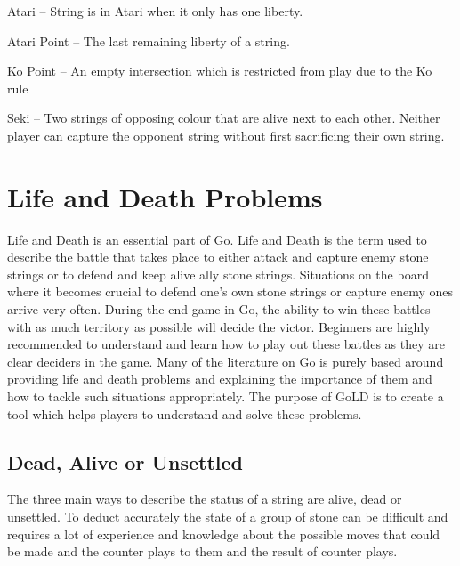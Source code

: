 \documentclass{l4proj}
\begin{document}
Atari – String is in Atari when it only has one liberty.

Atari Point – The last remaining liberty of a string.

Ko Point –  An empty intersection which is restricted from play due to the Ko rule

Seki – Two strings of opposing colour that are alive next to each other. Neither player can capture the opponent string without first sacrificing their own string.





\section{Life and Death Problems}

Life and Death is an essential part of Go. Life and Death is the term used to describe the battle that takes place to either attack and capture enemy stone strings or to defend and keep alive ally stone strings. Situations on the board where it becomes crucial to defend one’s own stone strings or capture enemy ones arrive very often. During the end game in Go, the ability to win these battles with as much territory as possible will decide the victor. Beginners are highly recommended to understand and learn how to play out these battles as they are clear deciders in the game. Many of the literature on Go is purely based around providing life and death problems and explaining the importance of them and how to tackle such situations appropriately.\cite{Cho1993}\cite{Davies1975} The purpose of GoLD is to create a tool which helps players to understand and solve these problems.

\subsection{Dead, Alive or Unsettled}

The three main ways to describe the status of a string are alive, dead or unsettled. To deduct accurately the state of a group of stone can be difficult and requires a lot of experience and knowledge about the possible moves that could be made and the counter plays to them and the result of counter plays.
\end{document}
